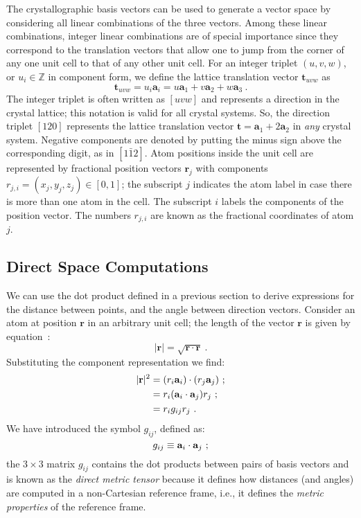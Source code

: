 The crystallographic basis vectors can be used to generate a vector space by considering all linear combinations of the three vectors. Among these linear combinations, integer linear combinations are of special importance since they correspond to the translation vectors that allow one to jump from the corner of any one unit cell to that of any other unit cell.  For an integer triplet $(u,v,w)$, or $u_i\in\mathbb{Z}$ in component form, we define the lattice translation vector $\mathbf{t}_{uvw}$ as
\begin{equation}
	\mathbf{t}_{uvw} = u_i\mathbf{a}_i = u\mathbf{a}_1+v\mathbf{a}_2+w\mathbf{a}_3 \ .
\end{equation}
The integer triplet is often written as $[uvw]$ and represents a direction in the crystal lattice; this notation is valid for all crystal systems. So, the direction triplet $[120]$ represents the lattice translation vector $\mathbf{t}=\mathbf{a}_1+2\mathbf{a}_2$ in \textit{any} crystal system. Negative components are denoted by putting the minus sign above the corresponding digit, as in $[1\bar{1}2]$. Atom positions inside the unit cell are represented by fractional position vectors $\mathbf{r}_j$ with components $r_{j,i}=(x_j,y_j,z_j)\in [0,1]$; the subscript $j$ indicates the atom label in case there is more than one atom in the cell.  The subscript $i$ labels the components of the position vector. The numbers $r_{j,i}$ are known as the fractional coordinates of atom $j$.

\subsection{Direct Space Computations} 
We can use the dot product defined in a previous section to derive expressions for the distance between points, and the angle between direction vectors. Consider an atom at position $\mathbf{r}$ in an arbitrary unit cell; the length of the vector $\mathbf{r}$ is given by equation~:
\[
	\vert\mathbf{r}\vert = \sqrt{\mathbf{r}\cdot\mathbf{r}} \ .
\]
Substituting the component representation we find:
\begin{align}
	\vert\mathbf{r}\vert^2 &= (r_i\mathbf{a}_i)\cdot(r_j\mathbf{a}_j)\ ;\nonumber\\
	&= r_i (\mathbf{a}_i\cdot\mathbf{a}_j) r_j\ ;\nonumber\\
	&= r_i g_{ij} r_j\ .\OClabel{eq:vectorlength}
\end{align}
We have introduced the symbol $g_{ij}$, defined as:
\begin{equation}
	g_{ij} \equiv \mathbf{a}_i\cdot\mathbf{a}_j \ ;\OClabel{eq:gdirectdef}
\end{equation}
the $3\times 3$ matrix $g_{ij}$ contains the dot products between pairs of basis vectors and is known as the \textit{direct metric tensor} because it defines how distances (and angles) are computed in a non-Cartesian reference frame, i.e., it defines the \textit{metric properties} of the reference frame.

